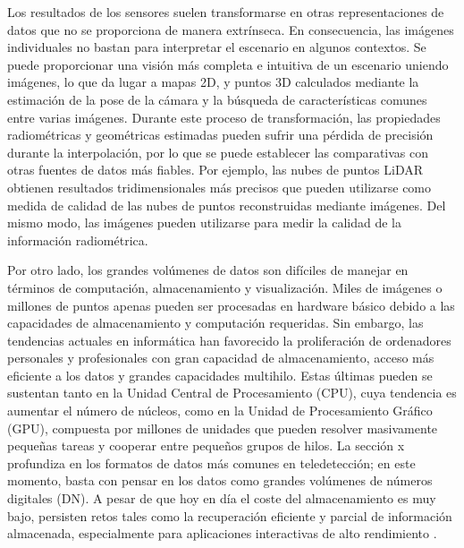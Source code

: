 Los resultados de los sensores suelen transformarse en otras representaciones de datos que no se proporciona de manera extrínseca. En consecuencia, las imágenes individuales no bastan para interpretar el escenario en algunos contextos. Se puede proporcionar una visión más completa e intuitiva de un escenario uniendo imágenes, lo que da lugar a mapas 2D, y puntos 3D calculados mediante la estimación de la pose de la cámara y la búsqueda de características comunes entre varias imágenes. Durante este proceso de transformación, las propiedades radiométricas y geométricas estimadas pueden sufrir una pérdida de precisión durante la interpolación, por lo que se puede establecer las comparativas con otras fuentes de datos más fiables. Por ejemplo, las nubes de puntos LiDAR obtienen resultados tridimensionales más precisos que pueden utilizarse como medida de calidad de las nubes de puntos reconstruidas mediante imágenes. Del mismo modo, las imágenes pueden utilizarse para medir la calidad de la información radiométrica.   

Por otro lado, los grandes volúmenes de datos son difíciles de manejar en términos de computación, almacenamiento y visualización. Miles de imágenes o millones de puntos apenas pueden ser procesadas en hardware básico debido a las capacidades de almacenamiento y computación requeridas. Sin embargo, las tendencias actuales en informática han favorecido la proliferación de ordenadores personales y profesionales con gran capacidad de almacenamiento, acceso más eficiente a los datos y grandes capacidades multihilo. Estas últimas pueden se sustentan tanto en la Unidad Central de Procesamiento (CPU), cuya tendencia es aumentar el número de núcleos, como en la Unidad de Procesamiento Gráfico (GPU), compuesta por millones de unidades que pueden resolver masivamente pequeñas tareas y cooperar entre pequeños grupos de hilos. La sección x profundiza en los formatos de datos más comunes en teledetección; en este momento, basta con pensar en los datos como grandes volúmenes de números digitales (DN). A pesar de que hoy en día el coste del almacenamiento es muy bajo, persisten retos tales como la recuperación eficiente y parcial de información almacenada, especialmente para aplicaciones interactivas de alto rendimiento \cite{bejar-martos_strategies_2022, ogayar-anguita_nested_2023}. 

